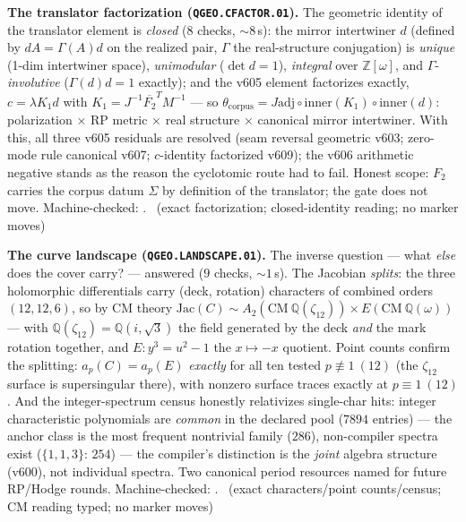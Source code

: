 \documentclass[11pt,a4paper]{article}
\theoremstyle{definition}
\begin{document}
\par\smallskip\noindent\textbf{The translator factorization
(\texttt{QGEO.CFACTOR.01}).}
The geometric identity of the translator element is \emph{closed}
($8$ checks, ${\sim}8$\,s): the mirror intertwiner $d$ (defined by
$dA=\Gamma(A)d$ on the realized pair, $\Gamma$ the real-structure
conjugation) is \emph{unique} (1-dim intertwiner space),
\emph{unimodular} ($\det d=1$), \emph{integral} over
$\mathbb{Z}[\omega]$, and $\Gamma$-\emph{involutive}
($\Gamma(d)d=1$ exactly); and the v605 element factorizes exactly,
$c=\lambda K_1d$ with $K_1=J^{-1}\overline{F_2}^TM^{-1}$ --- so
$\theta_{\mathrm{corpus}}=J\mathrm{adj}\circ\mathrm{inner}(K_1)\circ
\mathrm{inner}(d)$: polarization $\times$ RP metric $\times$ real
structure $\times$ canonical mirror intertwiner.  With this, all
three v605 residuals are resolved (seam reversal geometric v603;
zero-mode rule canonical v607; $c$-identity factorized v609); the
v606 arithmetic negative stands as the reason the cyclotomic route
had to fail.  Honest scope: $F_2$ carries the corpus datum $\Sigma$
by definition of the translator; the gate does not move.
Machine-checked: .
\mE\ (exact factorization; closed-identity reading; no marker moves)
\par\smallskip

\par\smallskip\noindent\textbf{The curve landscape
(\texttt{QGEO.LANDSCAPE.01}).}
The inverse question --- what \emph{else} does the cover carry? ---
answered ($9$ checks, ${\sim}1$\,s).  The Jacobian \emph{splits}: the
three holomorphic differentials carry (deck, rotation) characters of
combined orders $(12,12,6)$, so by CM theory
$\mathrm{Jac}(C)\sim A_2(\mathrm{CM}\ \mathbb{Q}(\zeta_{12}))\times
E(\mathrm{CM}\ \mathbb{Q}(\omega))$ --- with
$\mathbb{Q}(\zeta_{12})=\mathbb{Q}(i,\sqrt3)$ the field generated by
the deck \emph{and} the mark rotation together, and $E: y^3=u^2-1$
the $x\mapsto-x$ quotient.  Point counts confirm the splitting:
$a_p(C)=a_p(E)$ \emph{exactly} for all ten tested
$p\not\equiv1\ (12)$ (the $\zeta_{12}$ surface is supersingular
there), with nonzero surface traces exactly at $p\equiv1\ (12)$.
And the integer-spectrum census honestly relativizes single-char
hits: integer characteristic polynomials are \emph{common} in the
declared pool ($7894$ entries) --- the anchor class is the most
frequent nontrivial family ($286$), non-compiler spectra exist
($\{1,1,3\}$: $254$) --- the compiler's distinction is the
\emph{joint} algebra structure (v600), not individual spectra.  Two
canonical period resources named for future RP/Hodge rounds.
Machine-checked: .
\mE\ (exact characters/point counts/census; CM reading typed; no
marker moves)
\par\smallskip
\end{document}
